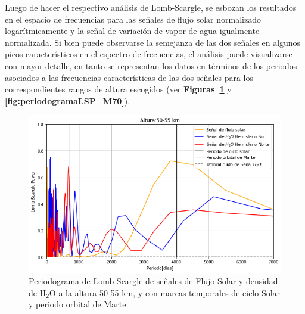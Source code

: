 \documentclass[a4paper,alpha-refs]{eSpectra}
\begin{document}
Luego de hacer el respectivo an\'alisis de Lomb-Scargle, se esbozan los resultados en el espacio de frecuencias para las se\~nales de flujo solar normalizado logar\'itmicamente y la se\~nal de variaci\'on de vapor de agua igualmente normalizada. Si bien puede observarse la semejanza de las dos se\~nales en algunos picos caracter\'isticos en el espectro de frecuencias, el an\'alisis puede visualizarse con mayor detalle, en tanto se representan los datos en t\'erminos de los periodos asociados a las frecuencias caracter\'isticas de las dos se\~nales para los correspondientes rangos de altura escogidos (ver \textbf{Figuras~\ref{fig:periodogramaLSP_M50}} y \textbf{\ref{fig:periodogramaLSP_M70}}).


\begin{figure}[htp]
	\includegraphics[width=\columnwidth, scale=1]{Imagenes/periodogramaLSP_M50.png}
    \caption{Periodograma de Lomb-Scargle de se\~nales de Flujo Solar y densidad de H$_2$O a la altura 50-55 km, y con marcas temporales de ciclo Solar y periodo orbital de Marte.}
    \label{fig:periodogramaLSP_M50}
\end{figure}
\end{document}
